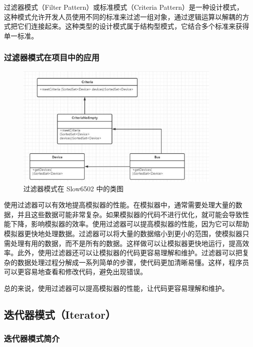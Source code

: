 \documentclass[cn,black,12pt,normal]{elegantnote}
\begin{document}
过滤器模式（Filter Pattern）或标准模式（Criteria Pattern）是一种设计模式，这种模式允许开发人员使用不同的标准来过滤一组对象，通过逻辑运算以解耦的方式把它们连接起来。这种类型的设计模式属于结构型模式，它结合多个标准来获得单一标准。

\subsubsection{过滤器模式在项目中的应用}

\begin{figure}[H]
  \centering
  \includegraphics[width=0.9\textwidth]{figures/过滤器模式.pdf}
  \caption{过滤器模式在 Slow6502 中的类图}
\end{figure}

使用过滤器可以有效地提高模拟器的性能。在模拟器中，通常需要处理大量的数据，并且这些数据可能非常复杂。如果模拟器的代码不进行优化，就可能会导致性能下降，影响模拟器的效率。使用过滤器可以提高模拟器的性能，因为它可以帮助模拟器更快地处理数据。过滤器可以将大量的数据缩小到更小的范围，使模拟器只需处理有用的数据，而不是所有的数据。这样做可以让模拟器更快地运行，提高效率。此外，使用过滤器还可以让模拟器的代码更容易理解和维护。过滤器可以把复杂的数据处理过程分解成一系列简单的步骤，使代码更加清晰易懂。这样，程序员可以更容易地查看和修改代码，避免出现错误。

总的来说，使用过滤器可以提高模拟器的性能，让代码更容易理解和维护。


\subsection{迭代器模式（Iterator）}

\subsubsection{迭代器模式简介}
\end{document}
